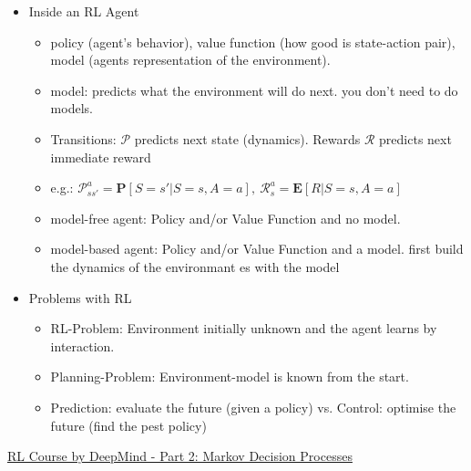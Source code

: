 \begin{itemize}[noitemsep,nolistsep]
\begin{itemize}
	\end{itemize} 
	\item Inside an RL Agent
	\begin{itemize}[noitemsep,nolistsep]
		\item policy (agent's behavior), value function (how good is state-action pair), model (agents representation of the environment).
		\item model: predicts what the environment will do next. you don't need to do models.
		\item Transitions: $\mathcal{P}$ predicts next state (dynamics). Rewards $\mathcal{R}$ predicts next immediate reward
		\item e.g.: $\mathcal{P}_{ss'}^a = \mathbf{P}[S=s'| S=s, A=a],\ \mathcal{R}_s^a = \mathbf{E}[R|S=s, A=a]$
		\item model-free agent: Policy and/or Value Function and no model.
		\item model-based agent: Policy and/or Value Function and a model. first build the dynamics of the environmant es with the model
	\end{itemize} 
	\item Problems with RL
	\begin{itemize}[noitemsep,nolistsep]
		\item RL-Problem: Environment initially unknown and the agent learns by interaction.
		\item Planning-Problem: Environment-model is known from the start. 
		\item Prediction: evaluate the future (given a policy) vs. Control: optimise the future (find the pest policy)
	\end{itemize} 
\end{itemize} 
\href{https://www.youtube.com/watch?v=lfHX2hHRMVQ&list=PLqYmG7hTraZDM-OYHWgPebj2MfCFzFObQ&index=2}{RL Course by DeepMind - Part 2: Markov Decision Processes}
